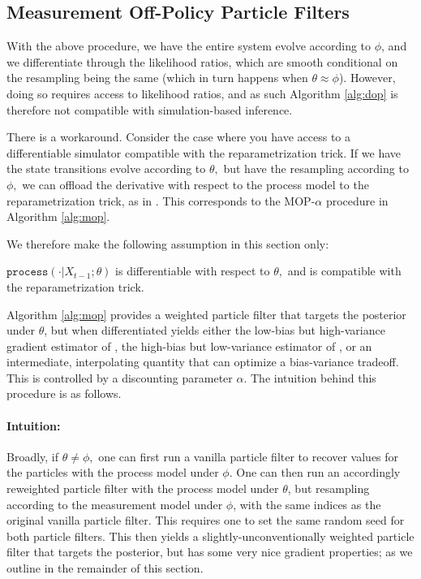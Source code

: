 \documentclass{article}
\begin{document}
\subsection{Measurement Off-Policy Particle Filters}

With the above procedure, we have the entire system evolve according to $\phi$, and we differentiate through the likelihood ratios, which are smooth conditional on the resampling being the same (which in turn happens when $\theta \approx \phi$). However, doing so requires access to likelihood ratios, and as such Algorithm \ref{alg:dop} is therefore not compatible with simulation-based inference. 

There is a workaround. Consider the case where you have access to a differentiable simulator compatible with the reparametrization trick. If we have the state transitions evolve according to $\theta,$ but have the resampling according to $\phi,$ we can offload the derivative with respect to the process model to the reparametrization trick, as in \cite{corenflos21}. This corresponds to the MOP-$\alpha$ procedure in Algorithm \ref{alg:mop}. 

We therefore make the following assumption in this section only:
\begin{aspt}
    $\texttt{process}(\cdot | X_{t-1}; \theta)$ is differentiable with respect to $\theta,$ and is compatible with the reparametrization trick. 
\end{aspt}

Algorithm \ref{alg:mop} provides a weighted particle filter that targets the posterior under $\theta$, but when differentiated yields either the low-bias but high-variance gradient estimator of \cite{poyiadjis11}, the high-bias but low-variance estimator of \cite{blei2018vsmc}, or an intermediate, interpolating quantity that can optimize a bias-variance tradeoff. This is controlled by a discounting parameter $\alpha$. The intuition behind this procedure is as follows. 

\paragraph{Intuition:} Broadly, if $\theta\neq\phi,$ one can first run a vanilla particle filter to recover values for the particles with the process model under $\phi.$ One can then run an accordingly reweighted particle filter with the process model under $\theta$, but resampling according to the measurement model under $\phi$, with the same indices as the original vanilla particle filter. This requires one to set the same random seed for both particle filters. This then yields a slightly-unconventionally weighted particle filter that targets the posterior, but has some very nice gradient properties; as we outline in the remainder of this section.
\end{document}
